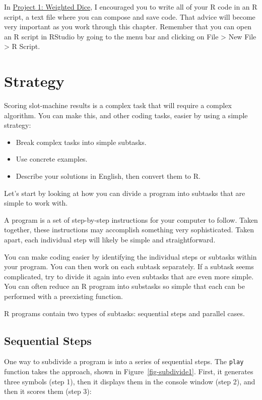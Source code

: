 \documentclass[
  letterpaper,
  DIV=11,
  numbers=noendperiod]{scrbook}
\providecommand{\tightlist}{%
  \setlength{\itemsep}{0pt}\setlength{\parskip}{0pt}}
\begin{document}
In \hyperref[sec-project-dice]{Project 1: Weighted Dice}, I encouraged
you to write all of your R code in an R script, a text file where you
can compose and save code. That advice will become very important as you
work through this chapter. Remember that you can open an R script in
RStudio by going to the menu bar and clicking on File \textgreater{} New
File \textgreater{} R Script.

\section{Strategy}\label{strategy}

Scoring slot-machine results is a complex task that will require a
complex algorithm. You can make this, and other coding tasks, easier by
using a simple strategy:

\begin{itemize}
\tightlist
\item
  Break complex tasks into simple subtasks.
\item
  Use concrete examples.
\item
  Describe your solutions in English, then convert them to R.
\end{itemize}

Let's start by looking at how you can divide a program into subtasks
that are simple to work with.

A program is a set of step-by-step instructions for your computer to
follow. Taken together, these instructions may accomplish something very
sophisticated. Taken apart, each individual step will likely be simple
and straightforward.

You can make coding easier by identifying the individual steps or
subtasks within your program. You can then work on each subtask
separately. If a subtask seems complicated, try to divide it again into
even subtasks that are even more simple. You can often reduce an R
program into substasks so simple that each can be performed with a
preexisting function.

R programs contain two types of subtasks: sequential steps and parallel
cases.

\subsection{Sequential Steps}\label{sequential-steps}

One way to subdivide a program is into a series of sequential steps. The
\texttt{play} function takes the approach, shown in
Figure~\ref{fig-subdivide1}. First, it generates three symbols (step 1),
then it displays them in the console window (step 2), and then it scores
them (step 3):
\end{document}
